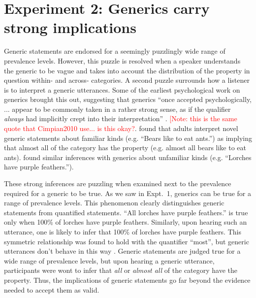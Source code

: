 \documentclass[10pt,letterpaper]{article}
\newcommand{\red}[1]{\textcolor{Red}{#1}}
\begin{document}
\section{Experiment 2: Generics carry strong implications}

Generic statements are endorsed for a seemingly puzzlingly wide range of prevalence levels. 
However, this puzzle is resolved when a speaker understands the generic to be vague and takes into account the distribution of the property in question within- and across- categories. 
A second puzzle surrounds how a listener is to interpret a generic utterances.
Some of the earliest psychological work on generics brought this out, suggesting that generics ``once accepted psychologically, ... appear to be commonly taken in a rather strong sense, as if the qualifier \emph{always} had implicitly crept into their interpretation'' \cite{Abelson1966}. \red{[Note: this is the same quote that Cimpian2010 use... is this okay?}.
%
 found that adults interpret novel generic statements about familiar kinds (e.g. ``Bears like to eat ants.'') as implying that almost all of the category has the property (e.g. almost all bears like to eat ants).
 found similar inferences with generics about unfamiliar kinds (e.g. ``Lorches have purple feathers.''). 

These strong inferences are puzzling when examined next to the prevalence required for a generic to be true. 
As we saw in Expt.~1, generics can be true for a range of prevalence levels. 
This phenomenon clearly distinguishes generic statements from quantified statements.
``All lorches have purple feathers.'' is true only when 100\% of lorches have purple feathers. 
Similarly, upon hearing such an utterance, one is likely to infer that 100\% of lorches have purple feathers.  
This symmetric relationship was found to hold with the quantifier ``most'', but generic utterances don't behave in this way \cite{Cimpian2010}.
Generic statements are judged true for a wide range of prevalence levels, but upon hearing a generic utterance, participants were wont to infer that \emph{all} or \emph{almost all} of the category have the property. 
Thus, the implications of generic statements go far beyond the evidence needed to accept them as valid.
\end{document}
